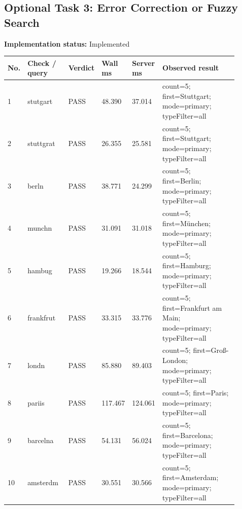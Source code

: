 \documentclass[10pt,a4paper]{article}
\begin{document}
\subsection{Optional Task 3: Error Correction or Fuzzy Search}
\textbf{Implementation status:} Implemented\\
\scriptsize
\begin{longtable}{|P{0.045\linewidth}|P{0.19\linewidth}|P{0.105\linewidth}|P{0.085\linewidth}|P{0.085\linewidth}|P{0.385\linewidth}|}
\hline
\textbf{No.} & \textbf{Check / query} & \textbf{Verdict} & \textbf{Wall ms} & \textbf{Server ms} & \textbf{Observed result}\\ \hline
{} 1 & stutgart & PASS & 48.390 & 37.014 & count=5; first=Stuttgart; mode=primary; typeFilter=all\\ \hline
{} 2 & stuttgrat & PASS & 26.355 & 25.581 & count=5; first=Stuttgart; mode=primary; typeFilter=all\\ \hline
{} 3 & berln & PASS & 38.771 & 24.299 & count=5; first=Berlin; mode=primary; typeFilter=all\\ \hline
{} 4 & munchn & PASS & 31.091 & 31.018 & count=5; first=München; mode=primary; typeFilter=all\\ \hline
{} 5 & hambug & PASS & 19.266 & 18.544 & count=5; first=Hamburg; mode=primary; typeFilter=all\\ \hline
{} 6 & frankfrut & PASS & 33.315 & 33.776 & count=5; first=Frankfurt am Main; mode=primary; typeFilter=all\\ \hline
{} 7 & londn & PASS & 85.880 & 89.403 & count=5; first=Groß-London; mode=primary; typeFilter=all\\ \hline
{} 8 & pariis & PASS & 117.467 & 124.061 & count=5; first=Paris; mode=primary; typeFilter=all\\ \hline
{} 9 & barcelna & PASS & 54.131 & 56.024 & count=5; first=Barcelona; mode=primary; typeFilter=all\\ \hline
{} 10 & amsterdm & PASS & 30.551 & 30.566 & count=5; first=Amsterdam; mode=primary; typeFilter=all\\ \hline
\end{longtable}
\normalsize
\end{document}
